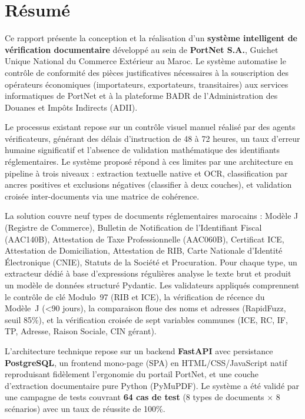 \chapter*{R\'{e}sum\'{e}}

\begingroup
{}

Ce rapport pr\'{e}sente la conception et la r\'{e}alisation d'un \textbf{syst\`{e}me intelligent de v\'{e}rification documentaire} d\'{e}velopp\'{e} au sein de \textbf{PortNet S.A.}, Guichet Unique National du Commerce Ext\'{e}rieur au Maroc. Le syst\`{e}me automatise le contr\^{o}le de conformit\'{e} des pi\`{e}ces justificatives n\'{e}cessaires \`{a} la souscription des op\'{e}rateurs \'{e}conomiques (importateurs, exportateurs, transitaires) aux services informatiques de PortNet et \`{a} la plateforme BADR de l'Administration des Douanes et Imp\^{o}ts Indirects (ADII).

Le processus existant repose sur un contr\^{o}le visuel manuel r\'{e}alis\'{e} par des agents v\'{e}rificateurs, g\'{e}n\'{e}rant des d\'{e}lais d'instruction de 48 \`{a} 72 heures, un taux d'erreur humaine significatif et l'absence de validation math\'{e}matique des identifiants r\'{e}glementaires. Le syst\`{e}me propos\'{e} r\'{e}pond \`{a} ces limites par une architecture en pipeline \`{a} trois niveaux : extraction textuelle native et OCR, classification par ancres positives et exclusions n\'{e}gatives (classifier \`{a} deux couches), et validation crois\'{e}e inter-documents via une matrice de coh\'{e}rence.

La solution couvre neuf types de documents r\'{e}glementaires marocains : Mod\`{e}le J (Registre de Commerce), Bulletin de Notification de l'Identifiant Fiscal (AAC140B), Attestation de Taxe Professionnelle (AAC060B), Certificat ICE, Attestation de Domiciliation, Attestation de RIB, Carte Nationale d'Identit\'{e} \'{E}lectronique (CNIE), Statuts de la Soci\'{e}t\'{e} et Procuration. Pour chaque type, un extracteur d\'{e}di\'{e} \`{a} base d'expressions r\'{e}guli\`{e}res analyse le texte brut et produit un mod\`{e}le de donn\'{e}es structur\'{e} Pydantic. Les validateurs appliqu\'{e}s comprennent le contr\^{o}le de cl\'{e} Modulo~97 (RIB et ICE), la v\'{e}rification de r\'{e}cence du Mod\`{e}le~J (\textless 90 jours), la comparaison floue des noms et adresses (RapidFuzz, seuil 85\%), et la v\'{e}rification crois\'{e}e de sept variables communes (ICE, RC, IF, TP, Adresse, Raison Sociale, CIN g\'{e}rant).

L'architecture technique repose sur un backend \textbf{FastAPI} avec persistance \textbf{PostgreSQL}, un frontend mono-page (SPA) en HTML/CSS/JavaScript natif reproduisant fid\`{e}lement l'ergonomie du portail PortNet, et une couche d'extraction documentaire pure Python (PyMuPDF). Le syst\`{e}me a \'{e}t\'{e} valid\'{e} par une campagne de tests couvrant \textbf{64 cas de test} (8 types de documents $\times$ 8 sc\'{e}narios) avec un taux de r\'{e}ussite de 100\%.

